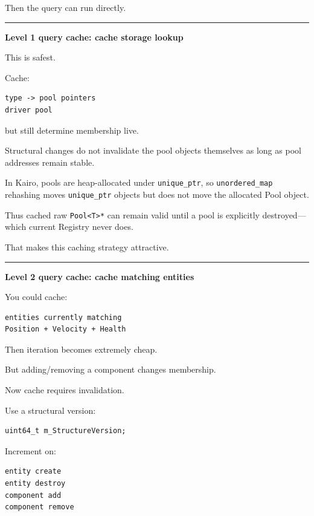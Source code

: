 Then the query can run directly.

\begin{center}\rule{0.5\linewidth}{0.5pt}\end{center}

\textbf{Level 1 query cache: cache storage lookup}

This is safest.

Cache:

\begin{verbatim}
type -> pool pointers
driver pool
\end{verbatim}

but still determine membership live.

Structural changes do not invalidate the pool objects themselves as long as pool addresses remain stable.

In Kairo, pools are heap-allocated under \texttt{unique\_ptr}, so \texttt{unordered\_map} rehashing moves \texttt{unique\_ptr} objects but does not move the allocated Pool object.

Thus cached raw \texttt{Pool\textless{}T\textgreater{}*} can remain valid until a pool is explicitly destroyed---which current Registry never does.

That makes this caching strategy attractive.

\begin{center}\rule{0.5\linewidth}{0.5pt}\end{center}

\textbf{Level 2 query cache: cache matching entities}

You could cache:

\begin{verbatim}
entities currently matching
Position + Velocity + Health
\end{verbatim}

Then iteration becomes extremely cheap.

But adding/removing a component changes membership.

Now cache requires invalidation.

Use a structural version:

\begin{verbatim}
uint64_t m_StructureVersion;
\end{verbatim}

Increment on:

\begin{verbatim}
entity create
entity destroy
component add
component remove
\end{verbatim}

